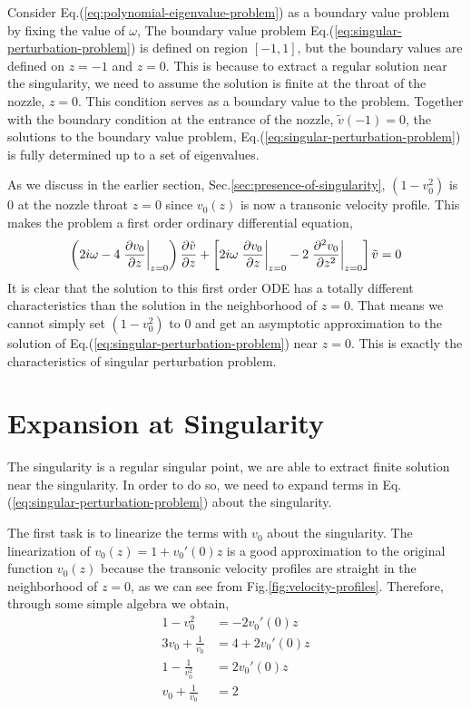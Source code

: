 Consider Eq.(\ref{eq:polynomial-eigenvalue-problem}) as a boundary value problem by fixing the value of $\omega$,
The boundary value problem Eq.(\ref{eq:singular-perturbation-problem}) is defined on region $[-1,1]$, but the boundary values are defined on $z=-1$ and $z=0$. This is because to extract a regular solution near the singularity, we need to assume the solution is finite at the throat of the nozzle, $z=0$. This condition serves as a boundary value to the problem. Together with the boundary condition at the entrance of the nozzle, $\tilde{v}(-1) = 0$, the solutions to the boundary value problem, Eq.(\ref{eq:singular-perturbation-problem}) is fully determined up to a set of eigenvalues.

As we discuss in the earlier section, Sec.\ref{sec:presence-of-singularity}, $(1-v_0^2)$ is 0 at the nozzle throat $z=0$ since $v_0(z)$ is now a transonic velocity profile. This makes the problem a first order ordinary differential equation,
\[
	\left( 2i\omega - 4\eval{\pdv{v_0}{z}}_{z=0} \right)\pdv{\tilde{v}}{z}
	+ \left[2i\omega\eval{\pdv{v_0}{z}}_{z=0} - 2\eval{\pdv[2]{v_0}{z}}_{z=0} \right]\tilde{v}  = 0
\]
It is clear that the solution to this first order ODE has a totally different characteristics than the solution in the neighborhood of $z=0$. That means we cannot simply set $(1-v_0^2)$ to 0 and get an asymptotic approximation to the solution of Eq.(\ref{eq:singular-perturbation-problem}) near $z=0$. This is exactly the characteristics of singular perturbation problem.

\section{Expansion at Singularity}
The singularity is a regular singular point, we are able to extract finite solution near the singularity. In order to do so, we need to expand terms in Eq.(\ref{eq:singular-perturbation-problem}) about the singularity.

The first task is to linearize the terms with $v_0$ about the singularity. The linearization of $v_0(z) = 1 + v_0'(0)z$ is a good approximation to the original function $v_0(z)$ because the transonic velocity profiles are straight in the neighborhood of $z=0$, as we can see from Fig.\ref{fig:velocity-profiles}. Therefore, through some simple algebra we obtain,
\begin{equation}
	\begin{aligned}
		1-v_0^2              & = -2v_0'(0)z    \\
		3v_0 + \frac{1}{v_0} & = 4 + 2v_0'(0)z \\
		1-\frac{1}{v_0^2}    & = 2v_0'(0)z     \\
		v_0 + \frac{1}{v_0}  & = 2
	\end{aligned}
\end{equation}

